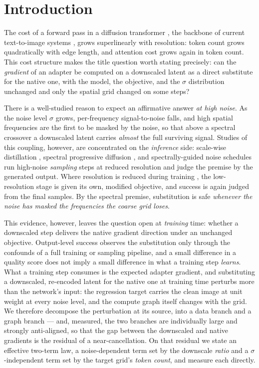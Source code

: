\section{Introduction}
\label{sec:intro}

The cost of a forward pass in a diffusion transformer
\citep{peebles2023dit}, the backbone of current text-to-image
systems \citep{esser2024scaling,chen2024pixartalpha}, grows
superlinearly with resolution: token count grows quadratically with
edge length, and attention cost grows again in token count. This
cost structure makes the title question worth stating precisely: can
the \emph{gradient} of an adapter be computed on a downscaled latent
as a direct substitute for the native one, with the model, the
objective, and the $\sigma$ distribution unchanged and only
the spatial grid changed on some steps?

There is a well-studied reason to expect an affirmative answer
\emph{at high noise}. As the
noise level $\sigma$ grows, per-frequency signal-to-noise falls, and
high spatial frequencies are the first to be masked by the noise, so
that above a spectral crossover a downscaled latent carries
\emph{almost} the full surviving signal. Studies of this coupling, however, are
concentrated on the \emph{inference} side: scale-wise
distillation \citep{starodubcev2025swd}, spectral progressive
diffusion \citep{xiao2026spd}, and spectrally-guided noise schedules
\citep{esteves2026spectral} run high-noise \emph{sampling} steps at
reduced resolution and judge the premise by the generated output.
Where resolution is reduced during training
\citep{jin2024pyramidal,karras2018progressive,chen2024pixartalpha,hoogeboom2023simple},
the low-resolution stage is given its own, modified objective, and
success is again judged from the final samples. By the spectral
premise, substitution is safe \emph{whenever the noise has masked the
frequencies the coarse grid loses}.

This evidence, however, leaves the question open at \emph{training}
time: whether a downscaled step delivers the native gradient
direction under an unchanged objective. Output-level success observes
the substitution only through the confounds of a full training or
sampling pipeline, and a small difference in a quality score does not
imply a small difference in what a training step \emph{learns}. What
a training step consumes is the expected adapter gradient, and
substituting a downscaled, re-encoded latent for the native one at
training time perturbs more than the network's input: the regression
target carries the clean image at unit weight at every noise level,
and the compute graph itself changes with the grid. We therefore
decompose the perturbation at its source, into a data branch and a
graph branch --- and, measured, the two branches are individually
large and strongly anti-aligned, so that the gap between the
downscaled and native gradients is the residual of a
near-cancellation. On that residual we state an effective two-term
law, a noise-dependent term set by the downscale \emph{ratio}
and a $\sigma$-independent term set by the target grid's \emph{token
count}, and measure each directly.

